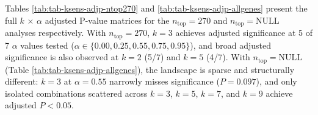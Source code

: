 \documentclass[
]{article}
\begin{document}
\begin{table}[!h]
\centering
\caption{\label{tab:tab-ksens-summary}Three-way comparison of $k$-sensitivity analyses differing only in gene-projection setting ($n_{\text{top}}$) and regularization ($\lambda$, $\xi$). All analyses span $k \in$ \{2, 3, 5, 7, 9\} $\times$ $\alpha \in$ \{0, 0.25, 0.35, 0.55, 0.75, 0.85, 0.95\} = 35 combinations. Count shows combinations achieving adjusted $P < 0.05$; bold highlights the $n_{\text{top}}=270$ result that restores $k = 3$ adjusted significance.}
\centering
{}
\end{table}

Tables \ref{tab:tab-ksens-adjp-ntop270} and
\ref{tab:tab-ksens-adjp-allgenes} present the full \(k\) \(\times\)
\(\alpha\) adjusted P-value matrices for the \(n_{\text{top}} = 270\)
and \(n_{\text{top}} = \text{NULL}\) analyses respectively. With
\(n_{\text{top}} = 270\), \(k = 3\) achieves adjusted significance at 5
of 7 \(\alpha\) values tested
(\(\alpha \in \{0.00, 0.25, 0.55, 0.75, 0.95\}\)), and broad adjusted
significance is also observed at \(k = 2\) (5/7) and \(k = 5\) (4/7).
With \(n_{\text{top}} = \text{NULL}\) (Table
\ref{tab:tab-ksens-adjp-allgenes}), the landscape is sparse and
structurally different: \(k = 3\) at \(\alpha=0.55\) narrowly misses
significance (\(P = 0.097\)), and only isolated combinations scattered
across \(k = 3\), \(k = 5\), \(k = 7\), and \(k = 9\) achieve adjusted
\(P < 0.05\).
\end{document}
